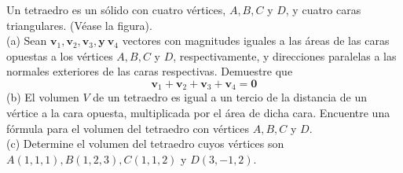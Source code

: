 \item Un tetraedro es un sólido con cuatro vértices, $A, B, C$ y $D$, y cuatro caras triangulares. (Véase la figura). \\
(a) Sean $\mathbf{v}_1, \mathbf{v}_2, \mathbf{v}_3, \mathbf{y}\ \mathbf{v}_4$ vectores con magnitudes iguales a las áreas de las caras opuestas a los vértices $A, B, C$ y $D$, respectivamente, y direcciones paralelas a las normales exteriores de las caras respectivas. Demuestre que
\[ \mathbf{v}_1 + \mathbf{v}_2 + \mathbf{v}_3 + \mathbf{v}_4 = \mathbf{0} \]
(b) El volumen $V$ de un tetraedro es igual a un tercio de la distancia de un vértice a la cara opuesta, multiplicada por el área de dicha cara. Encuentre una fórmula para el volumen del tetraedro con vértices $A, B, C$ y $D$. \\
(c) Determine el volumen del tetraedro cuyos vértices son $A(1, 1, 1), B(1, 2, 3), C(1, 1, 2)$ y $D(3, -1, 2)$.

\begin{center}
\end{center}
